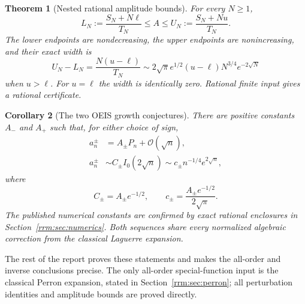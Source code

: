 \documentclass[11pt]{article}
\newtheorem{theorem}{Theorem}[section]
\newtheorem{corollary}[theorem]{Corollary}
\theoremstyle{remark}\newtheorem{remark}[theorem]{Remark}
\newcommand{\OO}{\mathcal O}
\begin{document}
\begin{theorem}[Nested rational amplitude bounds]\label{rrm:thm:certificate}
For every $N\ge1$,
\begin{equation}\label{rrm:eq:bracket}
 L_N:=\frac{S_N+N\ell}{T_N}\le A\le
 U_N:=\frac{S_N+Nu}{T_N}.
\end{equation}
The lower endpoints are nondecreasing, the upper endpoints are nonincreasing, and their exact width is
\begin{equation}\label{rrm:eq:width}
 U_N-L_N=\frac{N(u-\ell)}{T_N}
 \sim 2\sqrt\pi e^{1/2}(u-\ell)N^{3/4}e^{-2\sqrt N}
\end{equation}
when $u>\ell$. For $u=\ell$ the width is identically zero. Rational finite input gives a rational certificate.
\end{theorem}

\begin{corollary}[The two OEIS growth conjectures]\label{rrm:cor:oeis}
There are positive constants $A_-$ and $A_+$ such that, for either choice of sign,
\begin{align}
 a_n^\pm&=A_\pm P_n+\OO(\sqrt n),\label{rrm:eq:bothshadow}\\
 a_n^\pm&\sim C_\pm I_0(2\sqrt n)
 \sim c_\pm n^{-1/4}e^{2\sqrt n},\label{rrm:eq:bessel}
\end{align}
where
\begin{equation}\label{rrm:eq:normalization}
 C_\pm=A_\pm e^{-1/2},\qquad
 c_\pm=\frac{A_\pm e^{-1/2}}{2\sqrt\pi}.
\end{equation}
The published numerical constants are confirmed by exact rational enclosures in Section~\ref{rrm:sec:numerics}. Both sequences share every normalized algebraic correction from the classical Laguerre expansion.
\end{corollary}

The rest of the report proves these statements and makes the all-order and inverse conclusions precise. The only all-order special-function input is the classical Perron expansion, stated in Section~\ref{rrm:sec:perron}; all perturbation identities and amplitude bounds are proved directly.
\end{document}
